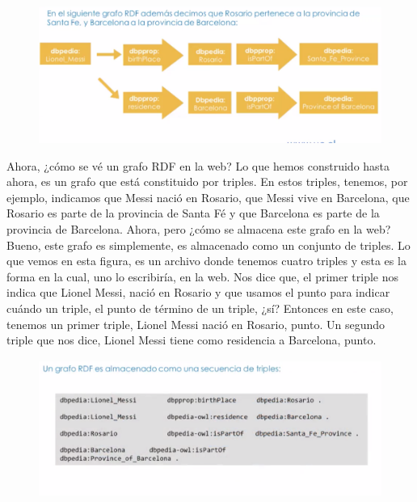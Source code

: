 \begin{figure}[H]
	\centering
	\includegraphics[height=4.5cm]{imagenes/capitulo3/17} 
	\caption{}
	\label{}
\end{figure}

Ahora, ¿cómo se vé un grafo RDF en la web? Lo que hemos construido hasta ahora, es un grafo que está constituido por triples. En estos triples, tenemos, por ejemplo, indicamos que Messi nació en Rosario, que Messi vive en Barcelona, que Rosario es parte de la provincia de Santa Fé y que Barcelona es parte de la provincia de Barcelona. Ahora, pero ¿cómo se almacena este grafo en la web? Bueno, este grafo es simplemente, es almacenado como un conjunto de triples. Lo que vemos en esta figura, es un archivo donde tenemos cuatro triples y esta es la forma en la cual, uno lo escribiría, en la web. Nos dice que, el primer triple nos indica que Lionel Messi, nació en Rosario y que usamos el punto para indicar cuándo un triple, el punto de término de un triple, ¿sí? Entonces en este caso, tenemos un primer triple, Lionel Messi nació en Rosario, punto. Un segundo triple que nos dice, Lionel Messi tiene como residencia a Barcelona, punto.

\begin{figure}[H]
	\centering
	\includegraphics[height=4.5cm]{imagenes/capitulo3/18} 
	\caption{}
	\label{}
\end{figure}

